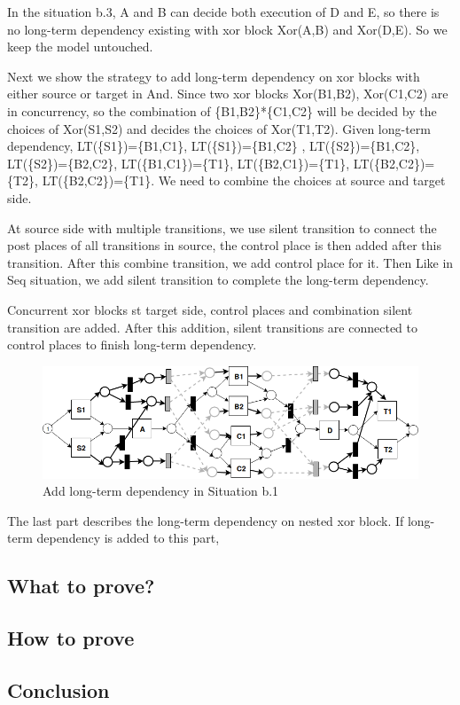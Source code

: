 \documentclass[]{article}
\begin{document}
In the situation b.3, A and B can decide both execution of D and E, so there is no long-term dependency existing with xor block Xor(A,B) and Xor(D,E). So we keep the model untouched. 

Next we show the strategy to add long-term dependency on xor blocks with either source or target in And. Since two xor blocks Xor(B1,B2), Xor(C1,C2) are in concurrency, so the combination of \{B1,B2\}*\{C1,C2\} will be decided by the choices of Xor(S1,S2) and decides the choices of Xor(T1,T2).
Given long-term dependency, LT(\{S1\})=\{B1,C1\}, LT(\{S1\})=\{B1,C2\} , LT(\{S2\})=\{B1,C2\},  LT(\{S2\})=\{B2,C2\}, LT(\{B1,C1\})=\{T1\}, LT(\{B2,C1\})=\{T1\}, LT(\{B2,C2\})=\{T2\},  LT(\{B2,C2\})=\{T1\}. 
We need to combine the choices at source and target side. 

At source side with multiple transitions, we use silent transition to connect the post places of all transitions in source, the control place is then added after this transition. After this combine transition, we add control place for it. Then Like in Seq situation, we add silent transition to complete the long-term dependency. 

Concurrent xor blocks st target side, control places and combination silent transition are added. After this addition, silent transitions are connected to control places to finish long-term dependency. 
\begin{figure}[!h]
	\includegraphics[width=\textwidth]{LT_And_Case_01.png}
	\caption{Add long-term dependency in Situation b.1}
	\label{fig:lt_and_case_01}
\end{figure}
The last part describes the long-term dependency on nested xor block. 
If long-term dependency is added to this part, 
\subsection{What to prove?}
\subsection{How to prove}
\subsection{Conclusion}
\end{document}
